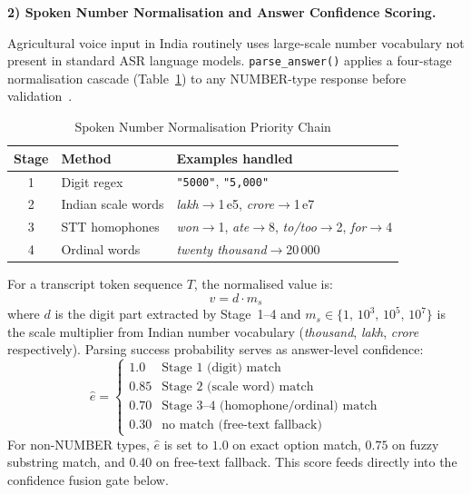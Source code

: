\documentclass[conference]{IEEEtran}
\begin{document}
\medskip
\noindent\textbf{2) Spoken Number Normalisation and Answer Confidence Scoring.}

\noindent Agricultural voice input in India routinely uses large-scale
number vocabulary not present in standard ASR language models.
\texttt{parse\_answer()} applies a four-stage normalisation cascade
(Table~\ref{tab:numstages}) to any NUMBER-type response before
validation~\cite{ref9,ref10}.

\begin{table}[h!]
  \caption{Spoken Number Normalisation Priority Chain}
  \label{tab:numstages}
  \centering
  \small
  \setlength{\tabcolsep}{4pt}
  \begin{tabular}{clp{3.8cm}}
    \toprule
    \textbf{Stage} & \textbf{Method} & \textbf{Examples handled} \\
    \midrule
    1 & Digit regex          & \texttt{"5000"}, \texttt{"5,000"} \\
    2 & Indian scale words   & \emph{lakh}$\!\to\!$1\,e5,
                               \emph{crore}$\!\to\!$1\,e7 \\
    3 & STT homophones       & \emph{won}$\!\to\!$1,
                               \emph{ate}$\!\to\!$8,
                               \emph{to/too}$\!\to\!$2,
                               \emph{for}$\!\to\!$4 \\
    4 & Ordinal words        & \emph{twenty thousand}$\!\to\!$20\,000 \\
    \bottomrule
  \end{tabular}
\end{table}

For a transcript token sequence $T$, the normalised value is:
\begin{equation}
  v = d \cdot m_s
  \label{eq:numparse}
\end{equation}
where $d$ is the digit part extracted by Stage~1--4 and $m_s \in
\{1,\,10^3,\,10^5,\,10^7\}$ is the scale multiplier from Indian
number vocabulary (\emph{thousand}, \emph{lakh}, \emph{crore}
respectively). Parsing success probability serves as answer-level
confidence:
\begin{equation}
  \hat{e} = \begin{cases}
    1.0 & \text{Stage 1 (digit) match} \\
    0.85 & \text{Stage 2 (scale word) match} \\
    0.70 & \text{Stage 3--4 (homophone/ordinal) match} \\
    0.30 & \text{no match (free-text fallback)}
  \end{cases}
  \label{eq:econf}
\end{equation}
For non-NUMBER types, $\hat{e}$ is set to $1.0$ on exact option match,
$0.75$ on fuzzy substring match, and $0.40$ on free-text fallback.
This score feeds directly into the confidence fusion gate below.
\end{document}
